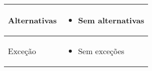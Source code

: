 \begin{quadro}[H]
\begin{tabular}{|p{3cm}|p{11cm}|}
        \hline
        Alternativas   &
        \begin{itemize}
            \item Sem alternativas
        \end{itemize}                                                                            \\
        \hline
        Exceção        &
        \begin{itemize}
            \item Sem exceções
        \end{itemize}                                                                            \\
        \hline
    \end{tabular}
\end{quadro}
